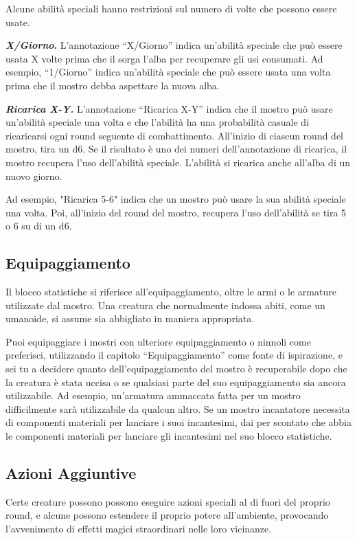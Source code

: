 \begin{multicols}{2}
Alcune abilità speciali hanno restrizioni sul numero di volte che
possono essere usate.

\textbf{\emph{X/Giorno}.} L'annotazione ``X/Giorno'' indica un'abilità speciale che può essere usata X volte prima che il sorga l'alba per recuperare gli usi consumati. Ad esempio, ``1/Giorno'' indica un'abilità speciale che può essere usata una volta prima che il mostro debba aspettare la nuova alba.

\emph{\textbf{Ricarica X-Y.}} L'annotazione ``Ricarica X-Y'' indica che il mostro può usare un'abilità speciale una volta e che l'abilità ha una probabilità casuale di ricaricarsi ogni round seguente di combattimento. All'inizio di ciascun round del mostro, tira un d6. Se il risultato è uno dei numeri dell'annotazione di ricarica, il mostro recupera l'uso dell'abilità speciale. L'abilità si ricarica anche all'alba di un nuovo giorno.

Ad esempio, "Ricarica 5-6" indica che un mostro può usare la sua abilità speciale una volta. Poi, all'inizio del round del mostro, recupera l'uso dell'abilità se tira 5 o 6 su di un d6.

\subsection{Equipaggiamento}

Il blocco statistiche si riferisce all'equipaggiamento, oltre le armi o le armature utilizzate dal mostro. Una creatura che normalmente indossa abiti, come un umanoide, si assume sia abbigliato in maniera appropriata.

Puoi equipaggiare i mostri con ulteriore equipaggiamento o ninnoli come preferisci, utilizzando il capitolo ``Equipaggiamento'' come fonte di ispirazione, e sei tu a decidere quanto dell'equipaggiamento del mostro è recuperabile dopo che la creatura è stata uccisa o se qualsiasi parte del suo equipaggiamento sia ancora utilizzabile. Ad esempio, un'armatura ammaccata fatta per un mostro difficilmente sarà utilizzabile da qualcun altro.  Se un mostro incantatore necessita di componenti  materiali per lanciare i suoi incantesimi, dai per  scontato che abbia le componenti materiali per lanciare  gli incantesimi nel suo blocco statistiche.  

\subsection{Azioni Aggiuntive}

Certe creature possono  possono eseguire azioni speciali al di fuori del proprio  round, e alcune possono estendere il proprio potere  all'ambiente, provocando l'avvenimento di effetti magici  straordinari nelle loro vicinanze.


\end{multicols}
